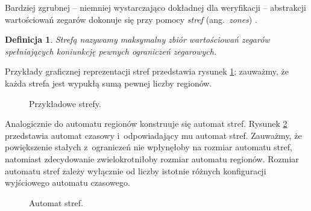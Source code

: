 \documentclass{pracamgr}
\newcommand{\ang}[1]{(ang.~\emph{#1})}
\theoremstyle{plain}
\newtheorem{definition}{Definicja}
\begin{document}
Bardziej zgrubnej -- niemniej wystarczająco dokładnej dla
weryfikacji -- abstrakcji wartościowań zegarów dokonuje się przy pomocy
\emph{stref} \ang{zones} \cite{henz-94}.
\begin{definition}
  Strefą nazywamy maksymalny zbiór wartościowań zegarów spełniających
  koniunkcję pewnych ograniczeń zegarowych.
\end{definition}
Przykłady graficznej reprezentacji stref przedstawia rysunek
\ref{img:zones}; zauważmy, że każda strefa jest wypukłą sumą pewnej
liczby regionów.
\begin{figure}
  \centering
  \hspace{1.5cm}
  \caption{Przykładowe strefy.}
  \label{img:zones}
\end{figure}

Analogicznie do automatu regionów konstruuje się automat stref.
Rysunek \ref{img:zones-automaton} przedstawia automat czasowy
i~odpowiadający mu automat stref. Zauważmy, że powiększenie stałych
z~ograniczeń nie wpłynęłoby na rozmiar automatu stref, natomiast
zdecydowanie zwielokrotniłoby rozmiar automatu regionów. Rozmiar
automatu stref zależy wyłącznie od liczby istotnie różnych
konfiguracji wyjściowego automatu czasowego.
\begin{figure}
  \centering
   \hspace{1cm}
  \caption{Automat stref.}
  \label{img:zones-automaton}
\end{figure}
\end{document}
